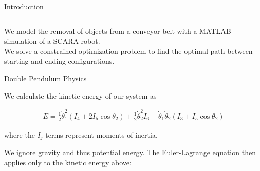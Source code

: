 \documentclass[final]{beamer}
\begin{document}
\begin{frame}{}
{\begin{columns}[t]
\begin{column}{.30\linewidth}
\begin{block}{\centering Introduction}
\begin{columns}[T]
\end{columns}

\vspace{0.3cm}



We model the removal of objects from a conveyor belt with a MATLAB simulation of a SCARA robot.\\

We solve a constrained optimization problem to find the optimal path between starting and
ending configurations. \\
 
\end{block}
                
                

\begin{block}{\centering Double Pendulum Physics} 

We calculate the kinetic energy of our system as

\vspace{-0.5cm}
	
\begin{align*}
	E = \frac{1}{2}\dot\theta_1^2(I_4 + 2I_5\cos\theta_2)
	+ \frac{1}{2}\dot\theta_2^2I_6
	+ \dot\theta_1\dot\theta_2(I_3 + I_5 \cos\theta_2)
\end{align*}

where the $I_j$ terms represent moments of inertia. 

We ignore gravity and thus potential energy. The Euler-Lagrange equation then applies
only to the kinetic energy above:


\end{block}
\end{column}
\end{columns}}
\end{frame}
\end{document}
